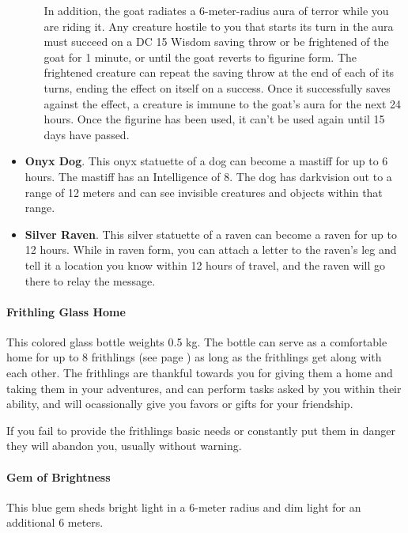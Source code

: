 \begin{itemize}
\begin{itemize}
                In addition, the goat radiates a 6-meter-radius aura of terror while you are riding it.
                Any creature hostile to you that starts its turn in the aura must succeed on a DC 15 Wisdom saving throw or be frightened of the goat for 1 minute, or until the goat reverts to figurine form.
                The frightened creature can repeat the saving throw at the end of each of its turns, ending the effect on itself on a success. Once it successfully saves against the effect, a creature is immune to the goat's aura for the next 24 hours.
                Once the figurine has been used, it can't be used again until 15 days have passed.
            \end{itemize}
            \item \textbf{Onyx Dog}.
            This onyx statuette of a dog can become a mastiff for up to 6 hours.
            The mastiff has an Intelligence of 8.
            The dog has darkvision out to a range of 12 meters and can see invisible creatures and objects within that range.
            \item \textbf{Silver Raven}.
            This silver statuette of a raven can become a raven for up to 12 hours.
            While in raven form, you can attach a letter to the raven's leg and tell it a location you know within 12 hours of travel, and the raven will go there to relay the message.
        \end{itemize}
    \paragraph{Frithling Glass Home}
        This colored glass bottle weights 0.5 kg.
        The bottle can serve as a comfortable home for up to 8 frithlings (see page \pageref{creature::frithling}) as long as the frithlings get along with each other.
        The frithlings are thankful towards you for giving them a home and taking them in your adventures, and can perform tasks asked by you within their ability, and will ocassionally give you favors or gifts for your friendship.

        If you fail to provide the frithlings basic needs or constantly put them in danger they will abandon you, usually without warning.
    \paragraph{Gem of Brightness}
        This blue gem sheds bright light in a 6-meter radius and dim light for an additional 6 meters.
